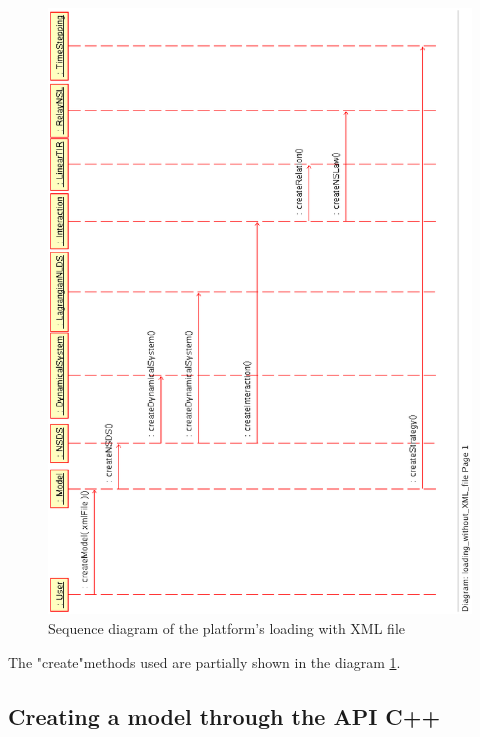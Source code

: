 \begin{figure}
\begin{center}
        \includegraphics[scale=0.75, clip]{figure/platform_loading_XML.ps}
        \caption{Sequence diagram of the platform's loading with XML file}
        \label{fig: platform's loading1}
\end{center}
\end{figure}

The "create"methods used are partially shown in the diagram \ref{fig: platform's loading1}.







\subsection{Creating a model through the API C++}


